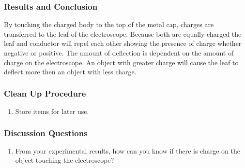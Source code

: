 \subsubsection*{Results and Conclusion}
By touching the charged body to the top of the metal cap, charges are transferred to the leaf of the electroscope. Because both are equally charged the leaf and conductor will repel each other showing the presence of charge whether negative or positive.
The amount of deflection is dependent on the amount of charge on the electroscope. An object with greater charge will cause the leaf to deflect more then an object with less charge. 

\subsubsection*{Clean Up Procedure}
\begin{enumerate}
\item{Store items for later use.} 
\end{enumerate}

\subsubsection*{Discussion Questions}
\begin{enumerate}
\item{From your experimental results, how can you know if there is charge on the object touching the electroscope?} 
\end{enumerate}



